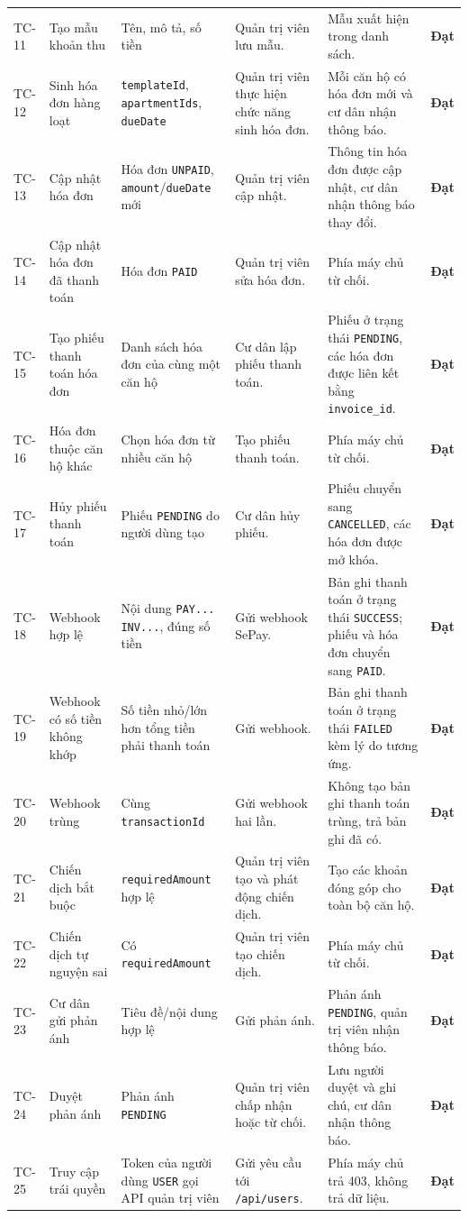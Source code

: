 ﻿\documentclass[12pt,a4paper]{report}
\begin{document}
\begin{longtable}{L{1.15cm} L{2.2cm} L{2.8cm} L{3.4cm} L{3.4cm} L{1.45cm}}
TC-11 & Tạo mẫu khoản thu & Tên, mô tả, số tiền & Quản trị viên lưu mẫu. & Mẫu xuất hiện trong danh sách. & \textbf{Đạt} \\
TC-12 & Sinh hóa đơn hàng loạt & \texttt{templateId}, \texttt{apartmentIds}, \texttt{dueDate} & Quản trị viên thực hiện chức năng sinh hóa đơn. & Mỗi căn hộ có hóa đơn mới và cư dân nhận thông báo. & \textbf{Đạt} \\
TC-13 & Cập nhật hóa đơn & Hóa đơn \texttt{UNPAID}, \texttt{amount}/\texttt{dueDate} mới & Quản trị viên cập nhật. & Thông tin hóa đơn được cập nhật, cư dân nhận thông báo thay đổi. & \textbf{Đạt} \\
TC-14 & Cập nhật hóa đơn đã thanh toán & Hóa đơn \texttt{PAID} & Quản trị viên sửa hóa đơn. & Phía máy chủ từ chối. & \textbf{Đạt} \\
TC-15 & Tạo phiếu thanh toán hóa đơn & Danh sách hóa đơn của cùng một căn hộ & Cư dân lập phiếu thanh toán. & Phiếu ở trạng thái \texttt{PENDING}, các hóa đơn được liên kết bằng \texttt{invoice\_id}. & \textbf{Đạt} \\
TC-16 & Hóa đơn thuộc căn hộ khác & Chọn hóa đơn từ nhiều căn hộ & Tạo phiếu thanh toán. & Phía máy chủ từ chối. & \textbf{Đạt} \\
TC-17 & Hủy phiếu thanh toán & Phiếu \texttt{PENDING} do người dùng tạo & Cư dân hủy phiếu. & Phiếu chuyển sang \texttt{CANCELLED}, các hóa đơn được mở khóa. & \textbf{Đạt} \\
TC-18 & Webhook hợp lệ & Nội dung \texttt{PAY... INV...}, đúng số tiền & Gửi webhook SePay. & Bản ghi thanh toán ở trạng thái \texttt{SUCCESS}; phiếu và hóa đơn chuyển sang \texttt{PAID}. & \textbf{Đạt} \\
TC-19 & Webhook có số tiền không khớp & Số tiền nhỏ/lớn hơn tổng tiền phải thanh toán & Gửi webhook. & Bản ghi thanh toán ở trạng thái \texttt{FAILED} kèm lý do tương ứng. & \textbf{Đạt} \\
TC-20 & Webhook trùng & Cùng \texttt{transactionId} & Gửi webhook hai lần. & Không tạo bản ghi thanh toán trùng, trả bản ghi đã có. & \textbf{Đạt} \\
TC-21 & Chiến dịch bắt buộc & \texttt{requiredAmount} hợp lệ & Quản trị viên tạo và phát động chiến dịch. & Tạo các khoản đóng góp cho toàn bộ căn hộ. & \textbf{Đạt} \\
TC-22 & Chiến dịch tự nguyện sai & Có \texttt{requiredAmount} & Quản trị viên tạo chiến dịch. & Phía máy chủ từ chối. & \textbf{Đạt} \\
TC-23 & Cư dân gửi phản ánh & Tiêu đề/nội dung hợp lệ & Gửi phản ánh. & Phản ánh \texttt{PENDING}, quản trị viên nhận thông báo. & \textbf{Đạt} \\
TC-24 & Duyệt phản ánh & Phản ánh \texttt{PENDING} & Quản trị viên chấp nhận hoặc từ chối. & Lưu người duyệt và ghi chú, cư dân nhận thông báo. & \textbf{Đạt} \\
TC-25 & Truy cập trái quyền & Token của người dùng \texttt{USER} gọi API quản trị viên & Gửi yêu cầu tới \texttt{/api/users}. & Phía máy chủ trả 403, không trả dữ liệu. & \textbf{Đạt} \\
\bottomrule
\end{longtable}
\endgroup
\end{document}
